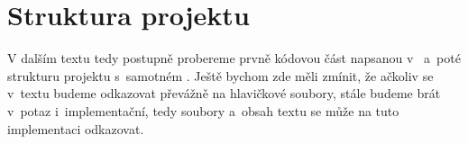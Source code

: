 
\section{Struktura projektu}

V dalším textu tedy postupně probereme prvně kódovou část napsanou v~\CPP{} a~poté strukturu projektu s~samotném \UE{}. Ještě bychom zde měli zmínit, že ačkoliv se v~textu budeme odkazovat převážně na hlavičkové soubory, stále budeme brát v~potaz i~implementační, tedy  soubory a~obsah textu se může na tuto implementaci odkazovat.


